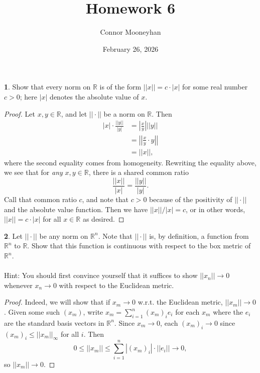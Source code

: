 \documentclass[12pt]{article}
\title{Homework 6}
\author{Connor Mooneyhan}
\date{February 26, 2026}
\theoremstyle{definition}
\newtheorem{ex}{}
\begin{document}
\maketitle

\begin{ex}
	Show that every norm on $\mathbb{R}$ is of the form $||x|| = c \cdot |x|$ for some real number $c > 0$; here $|x|$ denotes the absolute value of $x$.
\end{ex}
\begin{proof}
	Let $x, y \in \mathbb{R}$, and let $|| \cdot ||$ be a norm on $\mathbb{R}$.
	Then \begin{align*}
		|x| \cdot \frac{||y||}{|y|} & = \left| \frac{x}{y} \right| ||y||                  \\
		                            & = \left| \left| \frac{x}{y} \cdot y \right| \right| \\
		                            & = ||x||,
	\end{align*}
	where the second equality comes from homogeneity.
	Rewriting the equality above, we see that for \textit{any} $x, y \in \mathbb{R}$, there is a shared common ratio \begin{equation*}
		\frac{||x||}{|x|} = \frac{||y||}{|y|}.
	\end{equation*}
	Call that common ratio $c$, and note that $c > 0$ because of the positivity of $||\cdot||$ and the absolute value function.
	Then we have $||x||/|x| = c$, or in other words, $||x|| = c\cdot|x|$ for all $x \in \mathbb{R}$ as desired.
\end{proof}

\begin{ex}
	Let $|| \cdot ||$ be any norm on $\mathbb{R}^n$.
	Note that $|| \cdot ||$ is, by definition, a function from $\mathbb{R}^n$ to $\mathbb{R}$.
	Show that this function is continuous with respect to the box metric of $\mathbb{R}^n$.\\\\
	Hint: You should first convince yourself that it suffices to show $||x_n|| \to 0$ whenever $x_n \to 0$ with respect to the Euclidean metric.
\end{ex}
\begin{proof}
  Indeed, we will show that if $x_m \to 0$ w.r.t. the Euclidean metric, $||x_m||\to0$.
  Given some such $(x_m)$, write $x_m = \sum_{i=1}^n (x_m)_i e_i$ for each $x_m$ where the $e_i$ are the standard basis vectors in $\mathbb{R}^n$.
  Since $x_m \to 0$, each $(x_m)_i \to 0$ since $(x_m)_i \leq ||x_m||_\infty$ for all $i$.
  Then \begin{equation*}
    0 \leq ||x_m|| \leq \sum_{i=1}^n |(x_m)_i|\cdot||e_i|| \to 0,
  \end{equation*}
  so $||x_m||\to 0$.
\end{proof}
\end{document}
